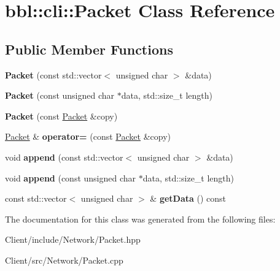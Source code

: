 \hypertarget{classbbl_1_1cli_1_1_packet}{}\section{bbl\+:\+:cli\+:\+:Packet Class Reference}
\label{classbbl_1_1cli_1_1_packet}
\subsection*{Public Member Functions}
\begin{DoxyCompactItemize}
\item 
\mbox{\label{classbbl_1_1cli_1_1_packet_a76b04619266ab2ae7fd7c14c50a1c5f7}} 
{\bfseries Packet} (const std\+::vector$<$ unsigned char $>$ \&data)
\item 
\mbox{\label{classbbl_1_1cli_1_1_packet_a84b84b6bbf21b76fc5769be81b4a8395}} 
{\bfseries Packet} (const unsigned char $\ast$data, std\+::size\+\_\+t length)
\item 
\mbox{\label{classbbl_1_1cli_1_1_packet_a81860a16fe26b2d3d362fba4668264bf}} 
{\bfseries Packet} (const \hyperlink{classbbl_1_1cli_1_1_packet}{Packet} \&copy)
\item 
\mbox{\label{classbbl_1_1cli_1_1_packet_a5cc278dcde53bfcb8cd77c3704880bae}} 
\hyperlink{classbbl_1_1cli_1_1_packet}{Packet} \& {\bfseries operator=} (const \hyperlink{classbbl_1_1cli_1_1_packet}{Packet} \&copy)
\item 
\mbox{\label{classbbl_1_1cli_1_1_packet_a82d910e8390eeb56c79c8610daa789b7}} 
void {\bfseries append} (const std\+::vector$<$ unsigned char $>$ \&data)
\item 
\mbox{\label{classbbl_1_1cli_1_1_packet_a8a6375187b78746db5145088c1f4a9bc}} 
void {\bfseries append} (const unsigned char $\ast$data, std\+::size\+\_\+t length)
\item 
\mbox{\label{classbbl_1_1cli_1_1_packet_aebfe64af8bdfbc3afce09ce0f33d64ff}} 
const std\+::vector$<$ unsigned char $>$ \& {\bfseries get\+Data} () const
\end{DoxyCompactItemize}


The documentation for this class was generated from the following files\+:\begin{DoxyCompactItemize}
\item 
Client/include/\+Network/Packet.\+hpp\item 
Client/src/\+Network/Packet.\+cpp\end{DoxyCompactItemize}
